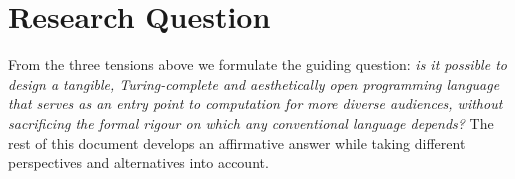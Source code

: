 \section{Research Question}
\label{sec:problem:question}
From the three tensions above we formulate the guiding question:
\emph{is it possible to design a tangible, Turing-complete and aesthetically open programming language that serves as an entry point to computation for more diverse audiences, without sacrificing the formal rigour on which any conventional language depends?}
The rest of this document develops an affirmative answer while taking different perspectives and alternatives into account.

\endinput
